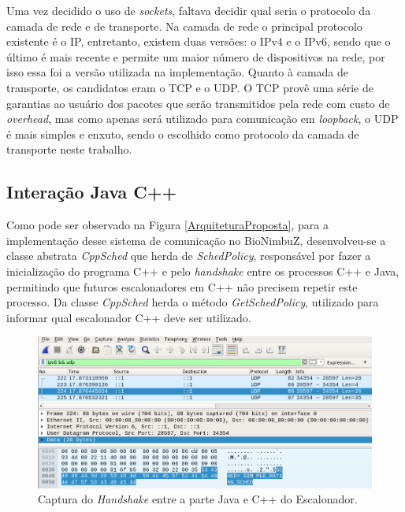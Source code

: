 Uma vez decidido o uso de \textit{sockets}, faltava decidir qual seria o protocolo da camada de rede e de transporte. Na camada de rede o principal protocolo existente é o \acrfull{IP}, entretanto, existem duas versões: o IPv4\cite{ipv4rfc} e o IPv6\cite{ipv6rfc}, sendo que o último é mais recente e permite um maior número de dispositivos na rede, por isso essa foi a versão utilizada na implementação. Quanto à camada de transporte, os candidatos eram o \acrshort{TCP}\cite{tcp_rfc} e o \acrshort{UDP}\cite{udp_rfc}. O \acrshort{TCP} provê uma série de garantias ao usuário dos pacotes que serão transmitidos pela rede com custo de \textit{overhead}, mas como apenas será utilizado para comunicação em \textit{loopback}, o \acrshort{UDP} é mais simples e enxuto, sendo o escolhido como protocolo da camada de transporte neste trabalho.


\subsection{Interação Java C++}

Como pode ser observado na Figura \ref{ArquiteturaProposta}, para a implementação desse sistema de comunicação no BioNimbuZ, desenvolveu-se a classe abstrata \textit{CppSched} que herda de \textit{SchedPolicy}, responsável por fazer a inicialização do programa C++ e pelo \textit{handshake} entre os processos C++ e Java, permitindo que futuros escalonadores em C++ não precisem repetir este processo. Da classe \textit{CppSched} herda o método \textit{GetSchedPolicy}, utilizado para informar qual escalonador C++ deve ser utilizado.

\begin{figure}[htbp]
	\centerline{\includegraphics[width=13cm]{img/Handshake3.png}}
	\caption{Captura do \textit{Handshake} entre a parte Java e C++ do Escalonador.}
	\label{Handshake}
\end{figure}

